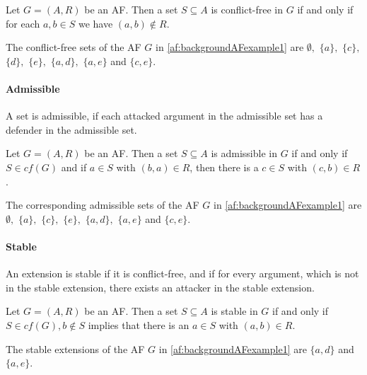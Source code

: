 \begin{definition}
    Let $G=(A,R)$ be an AF. Then a set $S \subseteq A$ is conflict-free in $G$ if and only if for each $a, b \in S$ we have $(a, b) \not\in R$.
\end{definition}

\begin{example}
    The conflict-free sets of the AF $G$ in \cref{af:backgroundAFexample1} are $\emptyset ,$
    $\{a\},$
    $\{c\},$
    $\{d\},$
    $\{e\},$
    $\{a, d\},$
    $\{a, e\}$ and
    $\{c, e\}$.
\end{example}





\paragraph{Admissible}  A set is admissible, if each attacked argument in the admissible set has a defender in the admissible set.


\begin{definition}
    Let $G=(A,R)$ be an AF. Then a set $S \subseteq A$ is admissible in $G$ if and only if $S \in cf(G)$ and if $a \in S$ with $(b, a) \in R$, then there is a $c \in S$ with $(c, b) \in R$.
\end{definition}
\begin{example}
        The corresponding admissible sets of the AF $G$ in \cref{af:backgroundAFexample1} are $\emptyset ,$
        $\{a\},$
        $\{c\},$
        $\{e\},$
        $\{a, d\},$
        $\{a, e\}$ and
        $\{c, e\}$.
\end{example}



\paragraph{Stable}  An extension is stable if it is conflict-free, and if for every argument, which is not in the stable extension, there exists an attacker in the stable extension.


\begin{definition}
    Let $G=(A,R)$ be an AF. Then a set  $S \subseteq A$ is stable in $G$ if and only if $S \in cf(G), b \not\in S$ implies that there is an $a \in S$ with $(a, b) \in R$.
\end{definition}
\begin{example}
        The stable extensions of the AF $G$ in \cref{af:backgroundAFexample1} are
        $\{a, d\}$ and
        $\{a, e\}$.
\end{example}


